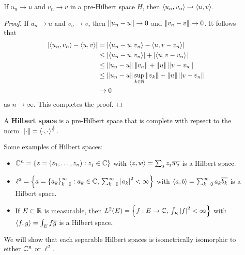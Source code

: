 \documentclass[a4paper]{article}
\begin{document}
\begin{thm}
If $u_n \to u$ and $v_n \to v$ in a pre-Hilbert space $H$, 
then $\left\langle u_n, v_n \right\rangle \to \left\langle u, v \right\rangle$.
\end{thm}

\begin{proof}
  If $u_n \to u$ and $v_n \to v$, then 
  $\left\lVert u_n - u\right\rVert \to 0$ and $\left\lVert v_n - v\right\rVert \to 0$. 
  It follows that 
  \[
  \begin{aligned}
    \left\lvert \left\langle u_n, v_n \right\rangle - \left\langle u, v \right\rangle\right\rvert 
    &= \left\lvert \left\langle u_n - u, v_n \right\rangle - \left\langle u, v - v_n \right\rangle\right\rvert \\
    &\leq \left\lvert \left\langle u_n - u, v_n \right\rangle\right\rvert 
    + \left\lvert \left\langle u, v - v_n \right\rangle\right\rvert \\
    &\leq \left\lVert u_n - u\right\rVert \left\lVert v_n\right\rVert + \left\lVert u\right\rVert \left\lVert v - v_n\right\rVert \\
    &\leq \left\lVert u_n - u\right\rVert \sup_{k \in \mathbb{N}} \left\lVert v_k\right\rVert + \left\lVert u\right\rVert 
    \left\lVert v - v_n\right\rVert \\
    &\to 0 
  \end{aligned}
  \]
  as $n \to \infty$. This completes the proof.
\end{proof}

\begin{defi}
A \textbf{Hilbert space} is a pre-Hilbert space that is 
complete with repsect to the norm 
$\left\lVert \cdot\right\rVert = \left\langle \cdot, \cdot \right\rangle^{\frac{1}{2}}$.
\end{defi}

\begin{eg}
Some examples of Hilbert spaces: 
\begin{itemize}
  \item $\mathbb{C}^n = \left\{ z = (z_1, \dots, z_n) : z_j \in \mathbb{C} \right\}$
  with
  $\left\langle z, w \right\rangle = \sum_j z_j \overline{w_j}$ is a Hilbert 
  space.

  \item $\ell^2 = \left\{ a = \left\{ a_k \right\}_{k=0}^\infty : 
  \text{$a_k \in \mathbb{C}$, $\sum_{k=0}^\infty \left\lvert a_k\right\rvert^2 < \infty$} \right\}$ 
  with
  $\left\langle a, b \right\rangle = \sum_{k=0}^\infty a_k \overline{b_k}$ 
  is a Hilbert space.

  \item If $E \subset \mathbb{R}$ is measurable, then 
  $L^2(E) = \left\{ f: \text{$E \to \mathbb{C}$, 
  $\int_E \left\lvert f\right\rvert^2 < \infty$} \right\}$ with 
  $\left\langle f, g \right\rangle = \int_E f \overline{g}$ is a Hilbert 
  space.
\end{itemize}
We will show that each separable Hilbert spaces is 
isometrically isomorphic to either $\mathbb{C}^n$ or $\ell^2$.
\end{eg}
\end{document}
